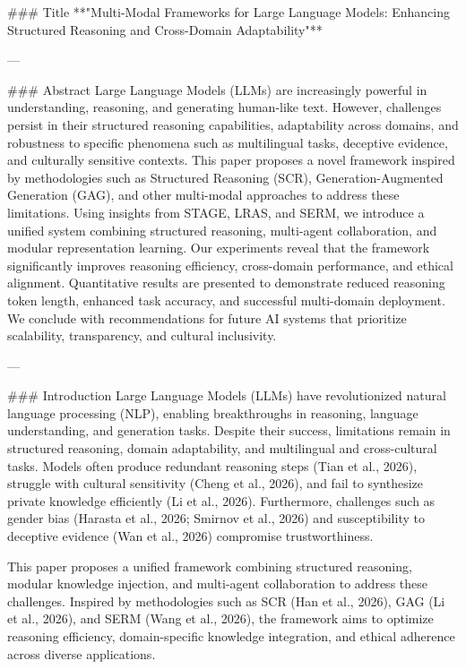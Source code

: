 ### Title  
**"Multi-Modal Frameworks for Large Language Models: Enhancing Structured Reasoning and Cross-Domain Adaptability"**

---

### Abstract  
Large Language Models (LLMs) are increasingly powerful in understanding, reasoning, and generating human-like text. However, challenges persist in their structured reasoning capabilities, adaptability across domains, and robustness to specific phenomena such as multilingual tasks, deceptive evidence, and culturally sensitive contexts. This paper proposes a novel framework inspired by methodologies such as Structured Reasoning (SCR), Generation-Augmented Generation (GAG), and other multi-modal approaches to address these limitations. Using insights from STAGE, LRAS, and SERM, we introduce a unified system combining structured reasoning, multi-agent collaboration, and modular representation learning. Our experiments reveal that the framework significantly improves reasoning efficiency, cross-domain performance, and ethical alignment. Quantitative results are presented to demonstrate reduced reasoning token length, enhanced task accuracy, and successful multi-domain deployment. We conclude with recommendations for future AI systems that prioritize scalability, transparency, and cultural inclusivity.

---

### Introduction  
Large Language Models (LLMs) have revolutionized natural language processing (NLP), enabling breakthroughs in reasoning, language understanding, and generation tasks. Despite their success, limitations remain in structured reasoning, domain adaptability, and multilingual and cross-cultural tasks. Models often produce redundant reasoning steps (Tian et al., 2026), struggle with cultural sensitivity (Cheng et al., 2026), and fail to synthesize private knowledge efficiently (Li et al., 2026). Furthermore, challenges such as gender bias (Harasta et al., 2026; Smirnov et al., 2026) and susceptibility to deceptive evidence (Wan et al., 2026) compromise trustworthiness.

This paper proposes a unified framework combining structured reasoning, modular knowledge injection, and multi-agent collaboration to address these challenges. Inspired by methodologies such as SCR (Han et al., 2026), GAG (Li et al., 2026), and SERM (Wang et al., 2026), the framework aims to optimize reasoning efficiency, domain-specific knowledge integration, and ethical adherence across diverse applications.

